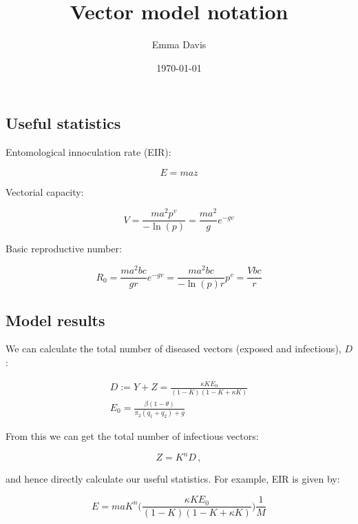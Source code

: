 \documentclass[a4paper,12pt]{article}
\begin{document}
\title{Vector model notation}
\author{Emma Davis}
\date{\today}
\maketitle

\subsection*{Useful statistics}

Entomological innoculation rate (EIR):

\begin{equation}
E = maz
\end{equation}

\noindent Vectorial capacity:

\begin{equation}
V = \frac{ma^2p^v}{-\ln(p)} = \frac{ma^2}{g}e^{-gv}
\end{equation}

\noindent Basic reproductive number:

\begin{equation}
R_0 = \frac{ma^2bc}{gr}e^{-gv} = \frac{ma^2bc}{-\ln(p)r}p^v = \frac{Vbc}{r}
\end{equation}

\subsection*{Model results}

We can calculate the total number of diseased vectors (exposed and infectious), $D$:

\begin{eqnarray}
D := Y+Z = \frac{\kappa KE_0}{(1-K)(1-K+\kappa K)}\\
E_0 = \frac{\beta(1-\theta)}{\pi_2(q_1+q_2)+g}
\end{eqnarray}

\noindent From this we can get the total number of infectious vectors:

\begin{equation}
Z = K^nD\,,
\end{equation}

and hence directly calculate our useful statistics. For example, EIR is given by:

\begin{equation}
E = maK^n\bigg(\frac{\kappa KE_0}{(1-K)(1-K+\kappa K)}\bigg)\frac{1}{M}
\end{equation}
\end{document}
